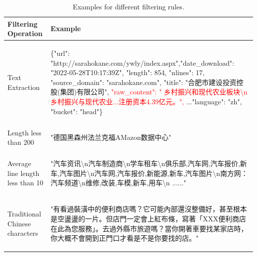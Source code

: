 \documentclass{article}
\begin{document}
\begin{table}[htbp]
    \caption{ Examples for different filtering rules.}\label{Data Filtering Statistics}
    \centering
    \begin{tabular}{p{4cm} | p{9cm} }
    \toprule
     Filtering Operation & Example \\
     \midrule
     \multicolumn{1}{m{4cm}|}{Text Extraction}  & \multicolumn{1}{m{9cm}}{\begin{CJK}{UTF8}{gbsn} \{"url": "http://sarahokane.com/ywly/index.aspx",\newline "date\_download": "2022-05-28T10:17:39Z", \newline "length": 854, \newline "nlines": 17, \newline "source\_domain": "sarahokane.com", \newline "title": "合肥市建设投资控股(集团)有限公司", \newline \textcolor{red}{"raw\_content": " 乡村振兴和现代农业板块\textbackslash n乡村振兴与现代农业...注册资本4.39亿元。",} \newline ...\newline "language": "zh", \newline "bucket": "head"\} \end{CJK}}  \\
     \midrule
     \multicolumn{1}{m{4cm}|}{Length less than 200}  & \multicolumn{1}{m{9cm}}{\begin{CJK}{UTF8}{gbsn} "德国黑森州法兰克福AMazon数据中心" \end{CJK}}  \\
     \midrule
     \multicolumn{1}{m{4cm}|}{Average line length less than 10}  & \multicolumn{1}{m{9cm}}{\begin{CJK}{UTF8}{gbsn} "汽车资讯\textbackslash n汽车制造商\textbackslash n学车租车\textbackslash n俱乐部,汽车网,汽车报价,新车,汽车图片\textbackslash n汽车网,汽车报价,新能源,新车,汽车图片\textbackslash n南方网：汽车频道\textbackslash n维修,改装,车模,新车,用车\textbackslash n ......" \end{CJK}}  \\
     \midrule
     \multicolumn{1}{m{4cm}|}{Traditional Chinese characters}  & \multicolumn{1}{m{9cm}}{\begin{CJK}{UTF8}{bsmi} "有看過裝潢中的便利商店嗎？它可能內部還沒整備好，甚至根本是空盪盪的一片。但店門一定會上紅布條，寫著「XXX便利商店在此為您服務」。去過外縣市旅遊嗎？當你開著車要找某家店時，你大概不會開到正門口才看是不是你要找的店。" \end{CJK}}  \\

\end{tabular}
\end{table}
\end{document}
